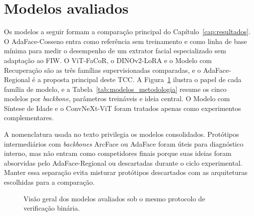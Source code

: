 \section{Modelos avaliados}

Os modelos a seguir formam a comparação principal do Capítulo~\ref{cap:resultados}. O AdaFace-Cosseno entra como referência sem treinamento e como linha de base mínima para medir o desempenho de um extrator facial especializado sem adaptação ao FIW. O ViT-FaCoR, o DINOv2-LoRA e o Modelo com Recuperação são as três famílias supervisionadas comparadas, e o AdaFace-Regional é a proposta principal deste TCC. A Figura~\ref{fig:modelos_metodologia} ilustra o papel de cada família de modelo, e a Tabela~\ref{tab:modelos_metodologia} resume os cinco modelos por \textit{backbone}, parâmetros treináveis e ideia central. O Modelo com Síntese de Idade e o ConvNeXt-ViT foram tratados apenas como experimentos complementares.

A nomenclatura usada no texto privilegia os modelos consolidados. Protótipos intermediários com \textit{backbones} ArcFace ou AdaFace foram úteis para diagnóstico interno, mas não entram como competidores finais porque suas ideias foram absorvidas pelo AdaFace-Regional ou descartadas durante o ciclo experimental. Manter essa separação evita misturar protótipos descartados com as arquiteturas escolhidas para a comparação.

\begin{figure}[h]
\centering
{}
\caption{Visão geral dos modelos avaliados sob o mesmo protocolo de verificação binária.}
\label{fig:modelos_metodologia}
\end{figure}

